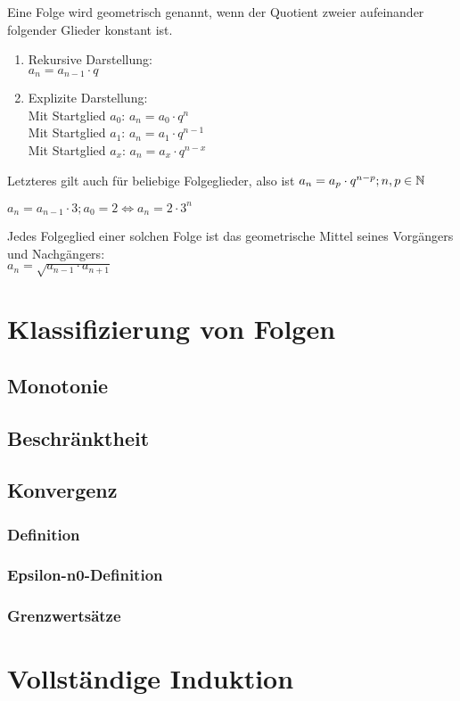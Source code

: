 \begin{Definition}
Eine Folge wird geometrisch genannt, wenn der Quotient zweier aufeinander folgender Glieder konstant ist.
\begin{enumerate}
\item Rekursive Darstellung:\\
\indent $a_{n}=a_{n-1}\cdot q$
\item Explizite Darstellung:\\
\indent Mit Startglied $a_{0}$: $a_{n}=a_{0}\cdot q^n$\\
\indent Mit Startglied $a_{1}$: $a_{n}=a_{1}\cdot q^{n-1}$\\
\indent Mit Startglied $a_{x}$: $a_{n}=a_{x}\cdot q^{n-x}$\\
\end{enumerate}
\end{Definition}

\begin{Bemerkung}
Letzteres gilt auch für beliebige Folgeglieder, also ist $a_{n}=a_{p}\cdot q^{n-p};n,p\in\mathbb{N}$
\end{Bemerkung}

\begin{Beispiel}
$a_{n}=a_{n-1}\cdot3;a_{0}=2\Leftrightarrow a_{n}=2\cdot3^n$
\end{Beispiel}

\begin{Bemerkung}
Jedes Folgeglied einer solchen Folge ist das geometrische Mittel seines Vorgängers und Nachgängers:\\
 $a_{n}=\sqrt{a_{n-1}\cdot a_{n+1}}$
\end{Bemerkung}

		\section{Klassifizierung von Folgen}


	\subsection{Monotonie}

	\subsection{Beschränktheit}

	\subsection{Konvergenz}

\subsubsection{Definition}
\subsubsection{Epsilon-n0-Definition}
\subsubsection{Grenzwertsätze}



		\section{Vollständige Induktion}
